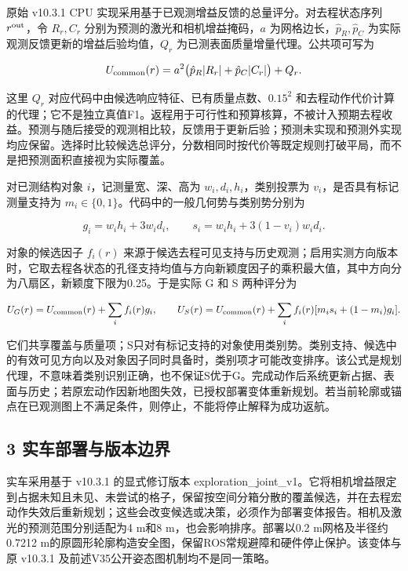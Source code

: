 \documentclass[]{article}
\begin{document}
原始 v10.3.1 CPU 实现采用基于已观测增益反馈的总量评分。对去程状态序列
\(r^{\rm out}\)，令 \(R_r,C_r\) 分别为预测的激光和相机增益掩码，\(a\)
为网格边长，\(\hat p_R,\hat p_C\)
为实际观测反馈更新的增益后验均值，\(Q_r\)
为已测表面质量增量代理。公共项可写为

\[
U_{\rm common}(r)=a^2\bigl(\hat p_R|R_r|+\hat p_C|C_r|\bigr)+Q_r .
\]

这里 \(Q_r\) 对应代码中由候选响应特征、已有质量点数、\(0.15^2\)
和去程动作代价计算的代理；它不是独立真值F1。返程用于可行性和预算核算，不被计入预期去程收益。预测与随后接受的观测相比较，反馈用于更新后验；预测未实现和预测外实现均应保留。选择时比较候选总评分，分数相同时按代价等既定规则打破平局，而不是把预测面积直接视为实际覆盖。

对已测结构对象 \(i\)，记测量宽、深、高为 \(w_i,d_i,h_i\)，类别投票为
\(v_i\)，是否具有标记测量支持为
\(m_i\in\{0,1\}\)。代码中的一般几何势与类别势分别为

\[
g_i=w_i h_i+3w_i d_i,\qquad
s_i=w_i h_i+3(1-v_i)w_i d_i.
\]

对象的候选因子 \(f_i(r)\)
来源于候选去程可见支持与历史观测；启用实测方向版本时，它取去程各状态的孔径支持均值与方向新颖度因子的乘积最大值，其中方向分为八扇区，新颖度下限为0.25。于是实际
G 和 S 两种评分为

\[
U_G(r)=U_{\rm common}(r)+\sum_i f_i(r)g_i,\qquad
U_S(r)=U_{\rm common}(r)+\sum_i f_i(r)[m_i s_i+(1-m_i)g_i].
\]

它们共享覆盖与质量项；S只对有标记支持的对象使用类别势。类别支持、候选中的有效可见方向以及对象因子同时具备时，类别项才可能改变排序。该公式是规划代理，不意味着类别识别正确，也不保证S优于G。完成动作后系统更新占据、表面与历史；若原宏动作因新地图失效，已授权部署变体重新规划。若当前轮廓或锚点在已观测图上不满足条件，则停止，不能将停止解释为成功返航。

\hypertarget{ux5b9eux8f66ux90e8ux7f72ux4e0eux7248ux672cux8fb9ux754c}{%
\subsection{3
实车部署与版本边界}\label{ux5b9eux8f66ux90e8ux7f72ux4e0eux7248ux672cux8fb9ux754c}}

实车采用基于 v10.3.1 的显式修订版本
exploration\_joint\_v1。它将相机增益限定到占据未知且未见、未尝试的格子，保留按空间分箱分散的覆盖候选，并在去程宏动作失效后重新规划；这些会改变候选或决策，必须作为部署变体报告。相机及激光的预测范围分别适配为4
m和8 m，也会影响排序。部署以0.2 m网格及半径约0.7212
m的原圆形轮廓构造安全图，保留ROS常规避障和硬件停止保护。该变体与原
v10.3.1 及前述V35公开姿态图机制均不是同一策略。
\end{document}
